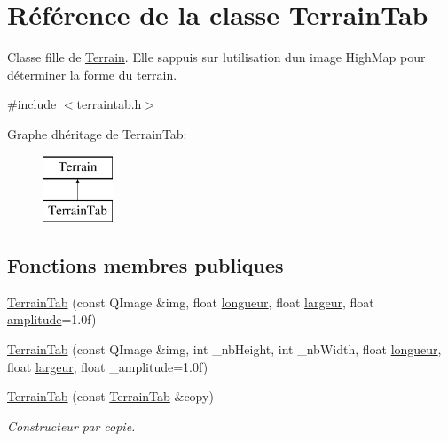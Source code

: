 \hypertarget{class_terrain_tab}{}\section{Référence de la classe Terrain\+Tab}
\label{class_terrain_tab}


Classe fille de \hyperlink{class_terrain}{Terrain}. Elle s\textquotesingle{}appuis sur l\textquotesingle{}utilisation d\textquotesingle{}un image High\+Map pour déterminer la forme du terrain.  




{\ttfamily \#include $<$terraintab.\+h$>$}

Graphe d\textquotesingle{}héritage de Terrain\+Tab\+:\begin{figure}[H]
\begin{center}
\leavevmode
\includegraphics[height=2.000000cm]{class_terrain_tab}
\end{center}
\end{figure}
\subsection*{Fonctions membres publiques}
\begin{DoxyCompactItemize}
\item 
\hyperlink{class_terrain_tab_ac31e7a1fb2f33a2875de3353c3eba76a}{Terrain\+Tab} (const Q\+Image \&img, float \hyperlink{class_terrain_ae25fe0ac0800f0e1c57c9b33f38f5a37}{longueur}, float \hyperlink{class_terrain_a1153a4642fd691e7fe25f9af1faba132}{largeur}, float \hyperlink{class_terrain_tab_a46e3284a38c404d326323091628abf03}{amplitude}=1.\+0f)
\item 
\hyperlink{class_terrain_tab_a04adc95147a7eceeac2eda0a62aa971a}{Terrain\+Tab} (const Q\+Image \&img, int \+\_\+nb\+Height, int \+\_\+nb\+Width, float \hyperlink{class_terrain_ae25fe0ac0800f0e1c57c9b33f38f5a37}{longueur}, float \hyperlink{class_terrain_a1153a4642fd691e7fe25f9af1faba132}{largeur}, float \+\_\+amplitude=1.\+0f)
\item 
\hyperlink{class_terrain_tab_afb333a647c91855ed76c41cba60903f7}{Terrain\+Tab} (const \hyperlink{class_terrain_tab}{Terrain\+Tab} \&copy)
\begin{DoxyCompactList}\small\item\em Constructeur par copie. \end{DoxyCompactList}\end{DoxyCompactItemize}
